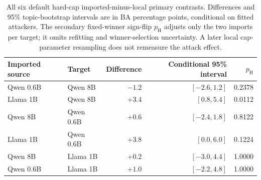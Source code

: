 \begin{table}[t]\centering\footnotesize
\caption{All six default hard-cap imported-minus-local primary contrasts. Differences and 95\% topic-bootstrap intervals are in BA percentage points, conditional on fitted attackers. The secondary fixed-winner sign-flip $p_{\mathrm H}$ adjusts only the two imports per target; it omits refitting and winner-selection uncertainty. A later local cap-parameter resampling does not remeasure the attack effect.}\label{tab:r46-hardcap-conditional}
\begin{tabular}{llrrr}\toprule
Imported source & Target & Difference & Conditional 95\% interval & $p_{\mathrm H}$\\\midrule
Qwen 0.6B & Qwen 8B & $-1.2$ & $[-2.6,1.2]$ & 0.2378\\
Llama 1B & Qwen 8B & $+3.4$ & $[0.8,5.4]$ & 0.0112\\
Qwen 8B & Qwen 0.6B & $+0.6$ & $[-2.4,1.8]$ & 0.8122\\
Llama 1B & Qwen 0.6B & $+3.8$ & $[0.0,6.0]$ & 0.1224\\
Qwen 8B & Llama 1B & $+0.2$ & $[-3.0,4.4]$ & 1.0000\\
Qwen 0.6B & Llama 1B & $+1.0$ & $[-2.2,4.8]$ & 1.0000\\
\bottomrule\end{tabular}
\end{table}
